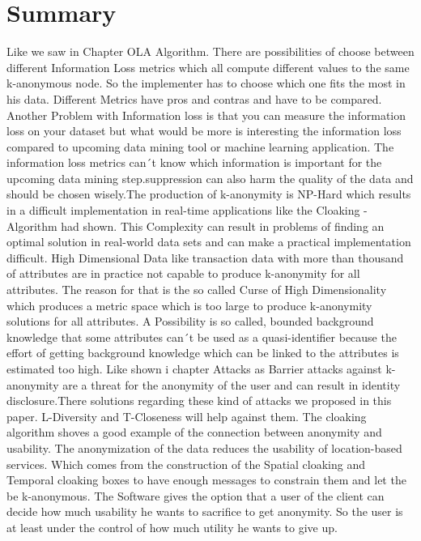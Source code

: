 \documentclass{llncs}
\begin{document}
\section{Summary}
Like we saw in Chapter OLA Algorithm. There are possibilities of choose between different Information Loss metrics which all compute different values to the same k-anonymous node. So the implementer has to choose which one fits the most in his data. Different Metrics have pros and contras and have to be compared. Another Problem with Information loss is that you can measure the information loss on your dataset but what would be more is interesting the information loss compared to upcoming data mining tool or machine learning application. The information loss metrics can´t know which information is important for the upcoming data mining step.suppression can also harm the quality of the data and should be chosen wisely.The production of k-anonymity is NP-Hard which results in a difficult implementation in real-time applications like the Cloaking - Algorithm had shown. This Complexity can result in problems of finding an optimal solution in real-world data sets and can make a practical implementation difficult. High Dimensional Data like transaction data with more than thousand of attributes are in practice not capable to produce k-anonymity for all attributes. The reason for that is the so called Curse of High Dimensionality which produces a metric space which is too large to produce k-anonymity solutions for all attributes. A  Possibility is so called, bounded background knowledge that some attributes can´t be used as a quasi-identifier because the effort of getting background knowledge which can be linked to the attributes is estimated too high. Like shown i chapter {Attacks as Barrier} attacks against k-anonymity are a threat for the anonymity of the user and can result in identity disclosure.There solutions regarding these kind of attacks we proposed in this paper. L-Diversity and T-Closeness will help against them. The cloaking algorithm shoves a good example of the connection between anonymity and usability. The anonymization of the data reduces the usability of location-based services. Which comes from the construction of the Spatial cloaking and Temporal cloaking boxes to have enough messages to constrain them and let the be k-anonymous. The Software gives the option that a user of the client can decide how much usability he wants to sacrifice to get anonymity. So the user is at least under the control of how much utility he wants to give up. 

\newpage


\end{document}
